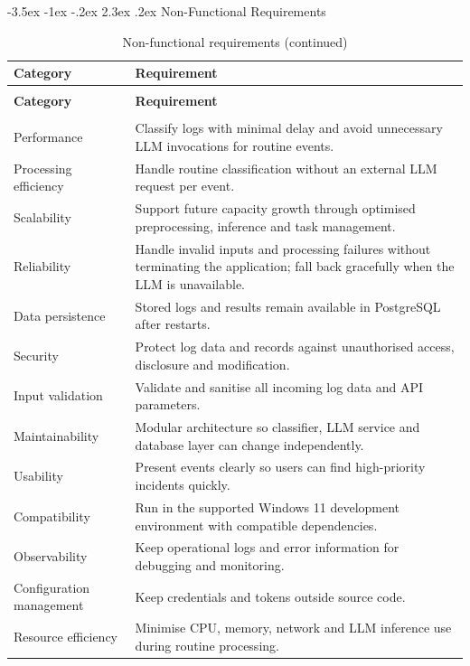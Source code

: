 \documentclass[12pt,a4paper]{report}
\makeatletter
\renewcommand{\arraystretch}{1.05}
\renewcommand\section{\@startsection {section}{1}{\z@}%
  {-3.5ex \@plus -1ex \@minus -.2ex}%
  {2.3ex \@plus .2ex}%
  {\normalfont\fontsize{17}{21}\selectfont\bfseries}}
\makeatother
\begin{document}
\section{Non-Functional Requirements}
\small
\renewcommand{\arraystretch}{1.2}
\begin{longtable}{>{\raggedright\arraybackslash}p{3.4cm} >{\raggedright\arraybackslash}p{12.3cm}}
\caption{Non-functional requirements}
\label{tab:nfr}\\
\toprule
\textbf{Category} & \textbf{Requirement}\\
\midrule
\endfirsthead
\caption[]{Non-functional requirements (continued)}\\
\toprule
\textbf{Category} & \textbf{Requirement}\\
\midrule
\endhead
\midrule
\multicolumn{2}{r}{Continued on next page}\\
\endfoot
\bottomrule
\endlastfoot
Performance & Classify logs with minimal delay and avoid unnecessary LLM invocations for routine events.\\
Processing efficiency & Handle routine classification without an external LLM request per event.\\
Scalability & Support future capacity growth through optimised preprocessing, inference and task management.\\
Reliability & Handle invalid inputs and processing failures without terminating the application; fall back gracefully when the LLM is unavailable.\\
Data persistence & Stored logs and results remain available in PostgreSQL after restarts.\\
Security & Protect log data and records against unauthorised access, disclosure and modification.\\
Input validation & Validate and sanitise all incoming log data and API parameters.\\
Maintainability & Modular architecture so classifier, LLM service and database layer can change independently.\\
Usability & Present events clearly so users can find high-priority incidents quickly.\\
Compatibility & Run in the supported Windows 11 development environment with compatible dependencies.\\
Observability & Keep operational logs and error information for debugging and monitoring.\\
Configuration management & Keep credentials and tokens outside source code.\\
Resource efficiency & Minimise CPU, memory, network and LLM inference use during routine processing.\\
\end{longtable}
\normalsize
\end{document}
